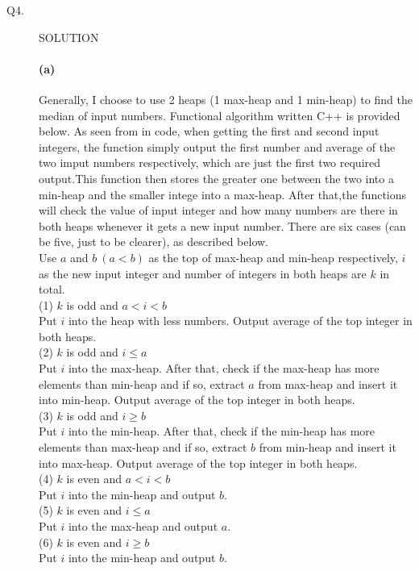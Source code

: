 \documentclass[11pt]{csc_assignment}
\begin{document}
\begin{description}
\newpage
\item[Q4.]


SOLUTION
\paragraph{(a)}
Generally, I choose to use 2 heaps (1 max-heap and 1 min-heap) to find the median of input numbers. Functional algorithm written C++ is provided below. 
As seen from in code, when getting the first and second input integers, the function simply output the first number and average of the two imput numbers respectively, which are just the first two required output.This function then stores the greater one between the two into a min-heap and the smaller intege into a max-heap. After that,the functions will check the value of input integer and how many numbers are there in both heaps whenever it gets a new input number. There are six cases (can be five, just to be clearer), as described below.\\
Use $ a $ and $ b \ (a<b)$  as the top of max-heap and min-heap respectively, $ i $ as the new input integer and number of integers in both heaps are $ k $ in total.\\
\space (1) $ k $ is odd and $ a<i<b $\\
Put $ i $ into the heap with less numbers. Output average of the top integer in both heaps.\\
\space (2) $ k $ is odd and $ i\leq a $\\
Put $ i $ into the max-heap. After that, check if the max-heap has more elements than min-heap and if so, extract $ a $ from max-heap and insert it into min-heap.  Output average of the top integer in both heaps.\\
\space (3) $ k $ is odd and $ i\geq b $\\
Put $ i $ into the min-heap. After that, check if the min-heap has more elements than max-heap and if so, extract $ b $ from min-heap and insert it into max-heap.  Output average of the top integer in both heaps.\\
\space (4) $ k $ is even and $ a<i<b $\\
Put $ i $ into the min-heap and output $ b $. \\
\space (5) $ k $ is even and $ i\leq a $\\
Put $ i $ into the max-heap and output $ a $. \\
\space (6) $ k $ is even and $ i\geq b $\\
Put $ i $ into the min-heap and output $ b $. \\

\end{description}
\end{document}
